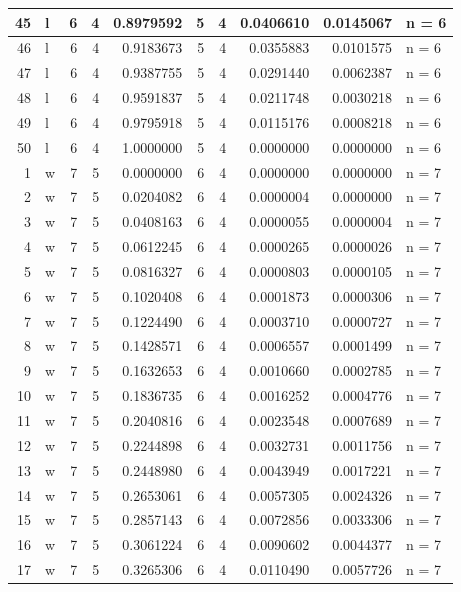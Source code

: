 \documentclass[
  letterpaper,
  DIV=11,
  numbers=noendperiod]{scrreprt}
\begin{document}
\begin{table}
\begin{tabular}[t]{r|l|r|r|r|r|r|r|r|l}
\hline
45 & l & 6 & 4 & 0.8979592 & 5 & 4 & 0.0406610 & 0.0145067 & n = 6\\
\hline
46 & l & 6 & 4 & 0.9183673 & 5 & 4 & 0.0355883 & 0.0101575 & n = 6\\
\hline
47 & l & 6 & 4 & 0.9387755 & 5 & 4 & 0.0291440 & 0.0062387 & n = 6\\
\hline
48 & l & 6 & 4 & 0.9591837 & 5 & 4 & 0.0211748 & 0.0030218 & n = 6\\
\hline
49 & l & 6 & 4 & 0.9795918 & 5 & 4 & 0.0115176 & 0.0008218 & n = 6\\
\hline
50 & l & 6 & 4 & 1.0000000 & 5 & 4 & 0.0000000 & 0.0000000 & n = 6\\
\hline
1 & w & 7 & 5 & 0.0000000 & 6 & 4 & 0.0000000 & 0.0000000 & n = 7\\
\hline
2 & w & 7 & 5 & 0.0204082 & 6 & 4 & 0.0000004 & 0.0000000 & n = 7\\
\hline
3 & w & 7 & 5 & 0.0408163 & 6 & 4 & 0.0000055 & 0.0000004 & n = 7\\
\hline
4 & w & 7 & 5 & 0.0612245 & 6 & 4 & 0.0000265 & 0.0000026 & n = 7\\
\hline
5 & w & 7 & 5 & 0.0816327 & 6 & 4 & 0.0000803 & 0.0000105 & n = 7\\
\hline
6 & w & 7 & 5 & 0.1020408 & 6 & 4 & 0.0001873 & 0.0000306 & n = 7\\
\hline
7 & w & 7 & 5 & 0.1224490 & 6 & 4 & 0.0003710 & 0.0000727 & n = 7\\
\hline
8 & w & 7 & 5 & 0.1428571 & 6 & 4 & 0.0006557 & 0.0001499 & n = 7\\
\hline
9 & w & 7 & 5 & 0.1632653 & 6 & 4 & 0.0010660 & 0.0002785 & n = 7\\
\hline
10 & w & 7 & 5 & 0.1836735 & 6 & 4 & 0.0016252 & 0.0004776 & n = 7\\
\hline
11 & w & 7 & 5 & 0.2040816 & 6 & 4 & 0.0023548 & 0.0007689 & n = 7\\
\hline
12 & w & 7 & 5 & 0.2244898 & 6 & 4 & 0.0032731 & 0.0011756 & n = 7\\
\hline
13 & w & 7 & 5 & 0.2448980 & 6 & 4 & 0.0043949 & 0.0017221 & n = 7\\
\hline
14 & w & 7 & 5 & 0.2653061 & 6 & 4 & 0.0057305 & 0.0024326 & n = 7\\
\hline
15 & w & 7 & 5 & 0.2857143 & 6 & 4 & 0.0072856 & 0.0033306 & n = 7\\
\hline
16 & w & 7 & 5 & 0.3061224 & 6 & 4 & 0.0090602 & 0.0044377 & n = 7\\
\hline
17 & w & 7 & 5 & 0.3265306 & 6 & 4 & 0.0110490 & 0.0057726 & n = 7\\

\end{tabular}
\end{table}
\end{document}
